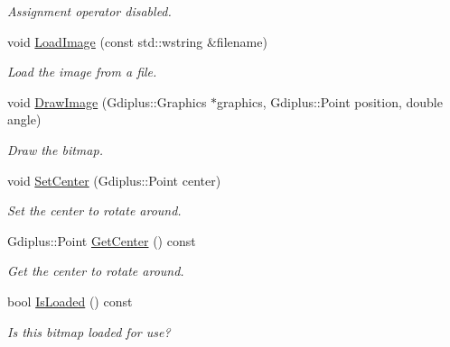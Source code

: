\begin{DoxyCompactItemize}
\begin{DoxyCompactList}\small\item\em Assignment operator disabled. \end{DoxyCompactList}\item 
void \hyperlink{class_c_rotated_bitmap_ab4bd32142fb989ebd61cf6f948a9b27f}{Load\+Image} (const std\+::wstring \&filename)
\begin{DoxyCompactList}\small\item\em Load the image from a file. \end{DoxyCompactList}\item 
void \hyperlink{class_c_rotated_bitmap_a335b9038c2df31f3517486d2e36d1928}{Draw\+Image} (Gdiplus\+::\+Graphics $\ast$graphics, Gdiplus\+::\+Point position, double angle)
\begin{DoxyCompactList}\small\item\em Draw the bitmap. \end{DoxyCompactList}\item 
void \hyperlink{class_c_rotated_bitmap_a1c1e4efb36d0d3512a3ffd355817d409}{Set\+Center} (Gdiplus\+::\+Point center)
\begin{DoxyCompactList}\small\item\em Set the center to rotate around. \end{DoxyCompactList}\item 
Gdiplus\+::\+Point \hyperlink{class_c_rotated_bitmap_ac721fb576d19da95a5640d729260fbe7}{Get\+Center} () const 
\begin{DoxyCompactList}\small\item\em Get the center to rotate around. \end{DoxyCompactList}\item 
bool \hyperlink{class_c_rotated_bitmap_ae8a14cdbc38ca7a7b15a665de89ab142}{Is\+Loaded} () const 
\begin{DoxyCompactList}\small\item\em Is this bitmap loaded for use? \end{DoxyCompactList}\end{DoxyCompactItemize}
